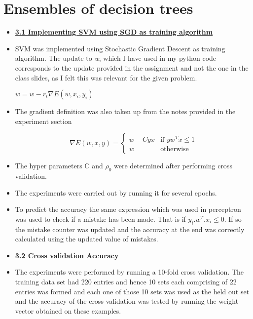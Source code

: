\documentclass[11pt]{article}
\begin{document}
\section{Ensembles of decision trees}
\begin{itemize}

\item[] \textbf{\underline{3.1 Implementing SVM using SGD as training algorithm}}

\item SVM was implemented using Stochastic Gradient Descent as training algorithm. The update to \emph w, which I have used in my python code corresponds to the update provided in the assignment and not the one in the class slides, as I felt this was relevant for the given problem.

$w = w - r_t \nabla E(w, x_i, y_i)$ 

\item The gradient definition was also taken up from the notes provided in the experiment section

$$ \nabla E(w, x, y) =
\begin{cases}
w - C y x  & \text{if } y w^T x \leq 1 \\
w & \text{otherwise}
\end{cases}
$$

\item The hyper parameters C and $\rho_0$ were determined after performing cross validation.

\item The experiments were carried out by running it for several epochs.

\item To predict the accuracy the same expression which was used in perceptron was used to check if a mistake has been made. That is  if  $y_i. w^T. x_i \leq  0 $. If so the mistake counter was updated and the accuracy at the end was correctly calculated using the updated value of mistakes. 


\item [] \textbf{\underline{3.2 Cross validation Accuracy}}

\item The experiments were performed by running a 10-fold cross validation. The training data set had 220 entries and hence 10 sets each comprising of 22 entries was formed and each one of those 10 sets was used as the held out set and the accuracy of the cross validation was tested by  running the weight vector obtained on these examples.


\end{itemize}
\end{document}
